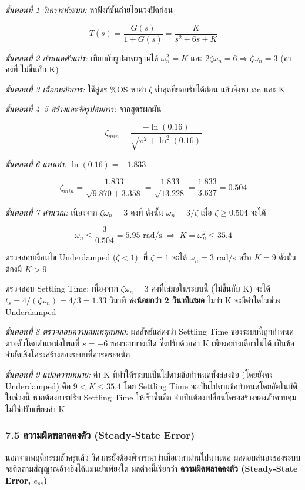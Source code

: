 \textit{ขั้นตอนที่ 1 วิเคราะห์ระบบ:} หาฟังก์ชันถ่ายโอนวงปิดก่อน

\[
T(s) = \frac{G(s)}{1+G(s)} = \frac{K}{s^2+6s+K}
\]

\textit{ขั้นตอนที่ 2 กำหนดตัวแปร:} เทียบกับรูปมาตรฐานได้ $\omega_n^2=K$ และ $2\zeta\omega_n=6 \Rightarrow \zeta\omega_n=3$ (ค่าคงที่ ไม่ขึ้นกับ K)

\textit{ขั้นตอนที่ 3 เลือกหลักการ:} ใช้สูตร \%OS หาค่า ζ ต่ำสุดที่ยอมรับได้ก่อน แล้วจึงหา ωn และ K

\textit{ขั้นตอนที่ 4–5 สร้างและจัดรูปสมการ:} จากสูตรผกผัน

\[
\zeta_{min} = \frac{-\ln(0.16)}{\sqrt{\pi^2+\ln^2(0.16)}}
\]

\textit{ขั้นตอนที่ 6 แทนค่า:} $\ln(0.16) = -1.833$

\[
\zeta_{min} = \frac{1.833}{\sqrt{9.870+3.358}} = \frac{1.833}{\sqrt{13.228}} = \frac{1.833}{3.637} = 0.504
\]

\textit{ขั้นตอนที่ 7 คำนวณ:} เนื่องจาก $\zeta\omega_n=3$ คงที่ ดังนั้น $\omega_n = 3/\zeta$ เมื่อ $\zeta \ge 0.504$ จะได้

\[
\omega_n \le \frac{3}{0.504} = 5.95 \text{ rad/s} \;\Rightarrow\; K=\omega_n^2 \le 35.4
\]

ตรวจสอบเงื่อนไข Underdamped ($\zeta<1$): ที่ $\zeta=1$ จะได้ $\omega_n=3$ rad/s หรือ $K=9$ ดังนั้นต้องมี $K>9$

ตรวจสอบ Settling Time: เนื่องจาก $\zeta\omega_n=3$ คงที่เสมอในระบบนี้ (ไม่ขึ้นกับ K) จะได้ $t_s=4/(\zeta\omega_n)=4/3=1.33$ วินาที ซึ่ง\textbf{น้อยกว่า 2 วินาทีเสมอ} ไม่ว่า K จะมีค่าใดในช่วง Underdamped

\textit{ขั้นตอนที่ 8 ตรวจสอบความสมเหตุสมผล:} ผลลัพธ์แสดงว่า Settling Time ของระบบนี้ถูกกำหนดตายตัวโดยตำแหน่งโพลที่ $s=-6$ ของระบบวงเปิด ซึ่งปรับด้วยค่า K เพียงอย่างเดียวไม่ได้ เป็นข้อจำกัดเชิงโครงสร้างของระบบที่ควรตระหนัก

\textit{ขั้นตอนที่ 9 แปลความหมาย:} ค่า K ที่ทำให้ระบบเป็นไปตามข้อกำหนดทั้งสองข้อ (โดยยังคง Underdamped) คือ \textbf{$9 < K \le 35.4$} โดย Settling Time จะเป็นไปตามข้อกำหนดโดยอัตโนมัติในช่วงนี้ หากต้องการปรับ Settling Time ให้เร็วขึ้นอีก จำเป็นต้องเปลี่ยนโครงสร้างของตัวควบคุม ไม่ใช่ปรับเพียงค่า K


\subsubsection{7.5 ความผิดพลาดคงตัว (Steady-State Error)}

นอกจากพฤติกรรมชั่วครู่แล้ว วิศวกรยังต้องพิจารณาว่าเมื่อเวลาผ่านไปนานพอ ผลตอบสนองของระบบจะติดตามสัญญาณอ้างอิงได้แม่นยำเพียงใด ผลต่างนี้เรียกว่า \textbf{ความผิดพลาดคงตัว (Steady-State Error, $e_{ss}$)}

